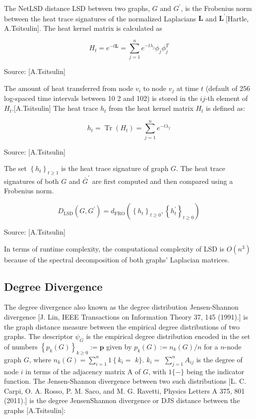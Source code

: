 The NetLSD distance LSD between two graphs, $G$ and $G^{\prime}$, is the Frobenius norm between the heat trace signatures of the normalized Laplacians $\mathbf{L}$ and $\mathbf{L}^{\prime}$[Hartle, A.Tsitsulin]. The heat kernel matrix is calculated as

\begin{equation}
H_{t}=e^{-t \mathbf{L}}=\sum_{j=1}^{n} e^{-t \lambda_{j}} \phi_{j} \phi_{j}^{T}
\end{equation}
\caption{Source: [A.Tsitsulin]}

The amount of heat transferred from node $v_{i}$ to node $v_{j}$ at time $t$ (default of 256 log-spaced time intervals between 10 2 and 102) is stored in the $i j$-th element of $H_{t}$.[A.Tsitsulin] The heat trace $h_{t}$ from the heat kernel matrix $H_{t}$ is defined as:

\begin{equation}
h_{t}=\operatorname{Tr}\left(H_{t}\right)=\sum_{j=1}^{n} e^{-t \lambda_{f}}  
\end{equation}
\caption{Source: [A.Tsitsulin]}

The set $\left\{h_{t}\right\}_{t \geq 1}$ is the heat trace signature of graph $G$. The heat trace signatures of both $G$ and $\bar{G}^{\prime}$ are first computed and then compared using a Frobenius norm.

\begin{equation}
D_{\mathrm{LSD}}\left(G, G^{\prime}\right)=d_{\mathrm{FRO}}\left(\left\{h_{t}\right\}_{t \geq 0},\left\{h_{t}^{\prime}\right\}_{t \geq 0}\right)
\end{equation}
\caption{Source: [A.Tsitsulin]}

In terms of runtime complexity, the computational complexity of LSD is $O\left(n^{3}\right)$ because of the spectral decomposition of both graphs' Laplacian matrices.

\subsection{Degree Divergence}
The degree divergence also known as the degree distribution Jensen-Shannon divergence [J. Lin, IEEE Transactions on Information Theory 37, 145 (1991).] is the graph distance measure between the empirical degree distributions of two graphs. The descriptor $\psi_{G}$ is the empirical degree distribution encoded in the set of numbers $\left\{p_{k}(G)\right\}_{k \geq 0}:=\mathbf{p}$ given by $p_{k}(G):=n_{k}(G) /n$ for a $n$-node graph $G$, where $n_{k}(G)=\sum_{i=1}^{n} 1\left\{k_{i}=\right.$ $k\}$. $k_{i}=$ $\sum_{j=1}^{n} A_{i j}$ is the degree of node $i$ in terms of the adjacency matrix A of $G$, with $1\{-\}$ being the indicator function.  The Jensen-Shannon divergence between two such distributions [L. C. Carpi, O. A. Rosso, P. M. Saco, and M. G. Ravetti, Physics Letters A 375, 801 (2011).] is the degree JensenShannon divergence or DJS distance between the graphs [A.Tsitsulin]:

